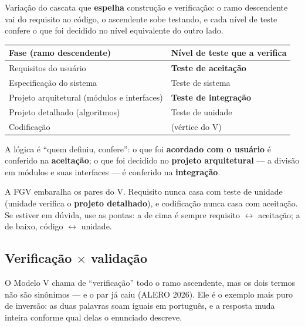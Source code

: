 \begin{conceito}
Variação do cascata que \textbf{espelha} construção e verificação: o ramo
descendente vai do requisito ao código, o ascendente sobe testando, e cada
nível de teste confere o que foi decidido no nível equivalente do outro lado.

\begin{center}
\begin{tabular}{@{}p{6cm}p{5.6cm}@{}}
\toprule
\textbf{Fase (ramo descendente)} & \textbf{Nível de teste que a verifica} \\
\midrule
Requisitos do usuário & \textbf{Teste de aceitação} \\
Especificação do sistema & Teste de sistema \\
Projeto arquitetural (módulos e interfaces) & \textbf{Teste de integração} \\
Projeto detalhado (algoritmos) & Teste de unidade \\
Codificação & (vértice do V) \\
\bottomrule
\end{tabular}
\end{center}

A lógica é ``quem definiu, confere'': o que foi \textbf{acordado com o
usuário} é conferido na \textbf{aceitação}; o que foi decidido no
\textbf{projeto arquitetural} --- a divisão em módulos e suas interfaces ---
é conferido na \textbf{integração}.
\end{conceito}

\begin{pegadinha}
A FGV embaralha os pares do V. Requisito nunca casa com teste de unidade
(unidade verifica o \textbf{projeto detalhado}), e codificação nunca casa com
aceitação. Se estiver em dúvida, use as pontas: a de cima é sempre
requisito $\leftrightarrow$ aceitação; a de baixo, código $\leftrightarrow$
unidade.
\end{pegadinha}

\subsection{Verificação $\times$ validação}

O Modelo V chama de ``verificação'' todo o ramo ascendente, mas os dois termos
não são sinônimos --- e o par já caiu (ALERO 2026). Ele é o exemplo mais puro
de inversão: as duas palavras soam iguais em português, e a resposta muda
inteira conforme qual delas o enunciado descreve.

